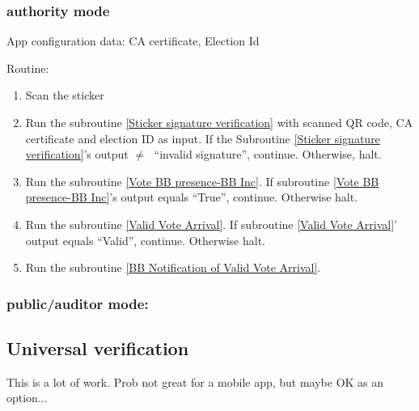 \documentclass{article}
\begin{document}
\subsubsection{\localVotingCenter{} authority mode}
App configuration data: CA certificate, Election Id

Routine:
\begin{enumerate}
    \item Scan the sticker
    \item Run the subroutine \ref{Sticker signature verification} with scanned QR code, CA certificate and election ID as input. If the Subroutine \ref{Sticker signature verification}'s output $\neq\;$ ``invalid signature'', continue. Otherwise, halt.
    \item Run the subroutine \ref{Vote BB presence-BB Inc}. If subroutine \ref{Vote BB presence-BB Inc}'s output equals ``True'', continue. Otherwise halt.
    \item Run the subroutine \ref{Valid Vote Arrival}. If subroutine \ref{Valid Vote Arrival}' output equals ``Valid'', continue. Otherwise halt.
    \item Run the subroutine \ref{BB Notification of Valid Vote Arrival}.
\end{enumerate}
\subsubsection{\localVotingCenter{}  public/auditor mode:}

\subsection{Universal verification}
    This is a lot of work. Prob not great for a mobile app, but maybe OK as an option...
\end{document}
